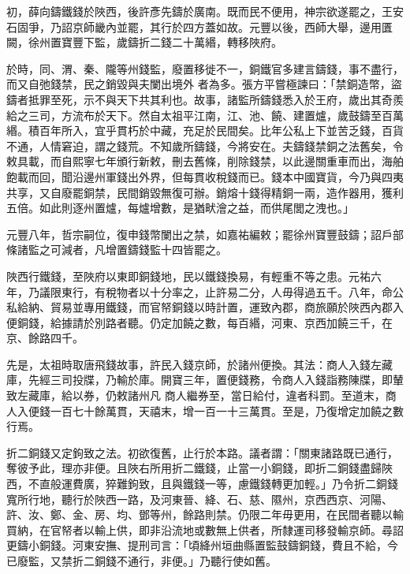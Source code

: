 \begin{pinyinscope}
 初，薛向鑄鐵錢於陜西，後許彥先鑄於廣南。既而民不便用，神宗欲遂罷之，王安石固爭，乃詔京師畿內並罷，其行於四方蓋如故。元豐以後，西師大舉，邊用匱闕，徐州置寶豐下監，歲鑄折二錢二十萬緡，轉移陜府。



 於時，同、渭、秦、隴等州錢監，廢置移徙不一，銅鐵官多建言鑄錢，事不盡行，而又自弛錢禁，民之銷毀與夫闌出境外
 者為多。張方平嘗極諫曰：「禁銅造幣，盜鑄者抵罪至死，示不與天下共其利也。故事，諸監所鑄錢悉入於王府，歲出其奇羨給之三司，方流布於天下。然自太祖平江南，江、池、饒、建置爐，歲鼓鑄至百萬緡。積百年所入，宜乎貫朽於中藏，充足於民間矣。比年公私上下並苦乏錢，百貨不通，人情窘迫，謂之錢荒。不知歲所鑄錢，今將安在。夫鑄錢禁銅之法舊矣，令敕具載，而自熙寧七年頒行新敕，刪去舊條，削除錢禁，以此邊關重車而出，海舶
 飽載而回，聞沿邊州軍錢出外界，但每貫收稅錢而已。錢本中國寶貨，今乃與四夷共享，又自廢罷銅禁，民間銷毀無復可辦。銷熔十錢得精銅一兩，造作器用，獲利五倍。如此則逐州置爐，每爐增數，是猶畎澮之益，而供尾閭之洩也。」



 元豐八年，哲宗嗣位，復申錢幣闌出之禁，如嘉祐編敕；罷徐州寶豐鼓鑄；詔戶部條諸監之可減者，凡增置鑄錢監十四皆罷之。



 陜西行鐵錢，至陜府以東即銅錢地，民以鐵錢換易，有輕重不等之患。元祐六
 年，乃議限東行，有稅物者以十分率之，止許易二分，人毋得過五千。八年，命公私給納、貿易並專用鐵錢，而官帑銅錢以時計置，運致內郡，商旅願於陜西內郡入便銅錢，給據請於別路者聽。仍定加饒之數，每百緡，河東、京西加饒三千，在京、餘路四千。



 先是，太祖時取唐飛錢故事，許民入錢京師，於諸州便換。其法：商人入錢左藏庫，先經三司投牒，乃輸於庫。開寶三年，置便錢務，令商人入錢詣務陳牒，即輦致左藏庫，給以券，仍敕諸州凡
 商人繼券至，當日給付，違者科罰。至道末，商人入便錢一百七十餘萬貫，天禧末，增一百一十三萬貫。至是，乃復增定加饒之數行焉。



 折二銅錢又定鉤致之法。初欲復舊，止行於本路。議者謂：「關東諸路既已通行，奪彼予此，理亦非便。且陜右所用折二鐵錢，止當一小銅錢，即折二銅錢盡歸陜西，不直般運費廣，猝難鉤致，且與鐵錢一等，慮鐵錢轉更加輕。」乃令折二銅錢寬所行地，聽行於陜西一路，及河東晉、絳、石、慈、隰州，京西西京、河陽、
 許、汝、鄭、金、房、均、鄧等州，餘路則禁。仍限二年毋更用，在民間者聽以輸買納，在官帑者以輸上供，即非沿流地或數無上供者，所隸運司移發輸京師。尋詔更鑄小銅錢。河東安撫、提刑司言：「頃絳州垣曲縣置監鼓鑄銅錢，費且不給，今已廢監，又禁折二銅錢不通行，非便。」乃聽行使如舊。




\end{pinyinscope}
